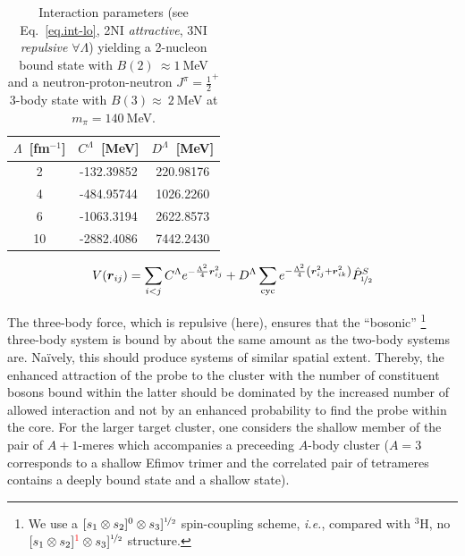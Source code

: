 \documentclass[onecolumn,preprint,nosuperscriptaddress,nofootinbib,12pt,linenumbers]{revtex4-1}
\newcommand{\red}[1]{\textcolor{red}{#1}}
\newcommand{\ie}{\textit{i.e.}\;}
\newcommand{\ve}[1]{\ensuremath{\boldsymbol{#1}}}
\newcommand{\la}{\label}
\begin{document}
\begin{table}[h!]\la{tab.testlec}
\setlength{\tabcolsep}{20pt}
\renewcommand{\arraystretch}{1.1}
\begin{center}
\begin{tabular}{ c c c }
 $\Lambda$~[fm$^{-1}$]   &   $C^\Lambda$~[MeV]     &    $D^\Lambda$~[MeV] \\\hline
2            &   -132.39852  & 220.98176 \\
4            &   -484.95744  & 1026.2260 \\
6            &   -1063.3194  & 2622.8573 \\
10           &   -2882.4086  & 7442.2430 \\
\end{tabular}
\end{center}
\caption{\small Interaction parameters (see Eq.~\eqref{eq.int-lo}, 2NI {\it attractive},
3NI {\it repulsive} $\forall\Lambda$) yielding a 2-nucleon bound state with $B(2)~\approx 1~$MeV and a
neutron-proton-neutron $J^\pi=\frac{1}{2}^+$ 3-body state
with $B(3)\approx~2~$MeV at $m_\pi=140~$MeV. 
}
\end{table}

\begin{equation}\label{eq.int-lo}
    V(\ve{r}_{ij})=\sum_{i<j}C^\Lambda e^{-\frac{\Lambda^2}{4}\ve{r}_{ij}^2}+
D^\Lambda \sum_\text{\scriptsize cyc} e^{-\frac{\Lambda^2}{4}\left(\ve{r}_{ij}^2+\ve{r}_{ik}^2\right)} \hat{P}^S_{\nicefrac{1}{2}}
\end{equation}

The three-body force, which is repulsive (here), ensures that the ``bosonic''
\footnote{We use a 
$[s_1\otimes s_2]^0\otimes s_3]^{\nicefrac{1}{2}}$
spin-coupling scheme, \ie, compared with 
${}^3$H, no $[s_1\otimes s_2]^{\red{1}}\otimes s_3]^{\nicefrac{1}{2}}$
structure.}
three-body system is
bound by about the same amount as the two-body systems are. Na\"ively, this should produce systems
of similar spatial extent. Thereby, the enhanced attraction of the probe to the cluster with the number
of constituent bosons bound within the latter should be dominated by the increased number of allowed
interaction and not by an enhanced probability to find the probe within the core. For the larger
target cluster, one considers the shallow member of the pair of $A+1$-meres which accompanies a
preceeding $A$-body cluster ($A=3$ corresponds to a shallow Efimov trimer and the correlated pair
of tetrameres contains a deeply bound state and a shallow state).
\end{document}
